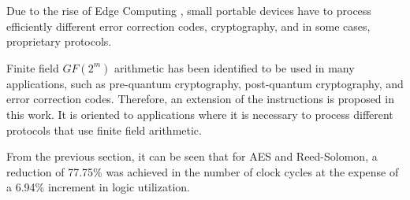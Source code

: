 Due to the rise of Edge Computing \cite{7488250}, small portable devices have to process 
efficiently different error correction codes, cryptography, 
and in some cases, proprietary protocols.

Finite field $GF(2^m)$ arithmetic has been identified to be used in many applications, such as pre-quantum cryptography, 
post-quantum cryptography, and error correction codes. Therefore, an extension of the instructions is proposed in this work. 
It is oriented to applications where it is necessary to process different protocols that use finite field arithmetic.

From the previous section, it can be seen that for AES and Reed-Solomon, a reduction of 77.75\% was achieved 
in the number of clock cycles at the expense of a 6.94\% increment in logic utilization.
